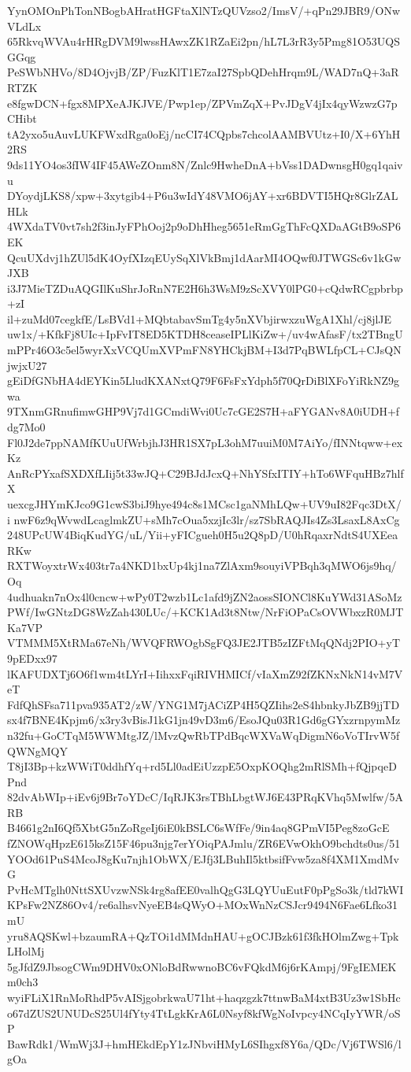 YynOMOnPhTonNBogbAHratHGFtaXlNTzQUVzso2/ImsV/+qPn29JBR9/ONwVLdLx
65RkvqWVAu4rHRgDVM9lwssHAwxZK1RZaEi2pn/hL7L3rR3y5Pmg81O53UQSGGqg
PeSWbNHVo/8D4OjvjB/ZP/FuzKlT1E7zaI27SpbQDehHrqm9L/WAD7nQ+3aRRTZK
e8fgwDCN+fgx8MPXeAJKJVE/Pwp1ep/ZPVmZqX+PvJDgV4jIx4qyWzwzG7pCHibt
tA2yxo5uAuvLUKFWxdRga0oEj/ncCI74CQpbs7chcolAAMBVUtz+I0/X+6YhH2RS
9ds11YO4os3fIW4IF45AWeZOnm8N/Znlc9HwheDnA+bVss1DADwnsgH0gq1qaivu
DYoydjLKS8/xpw+3xytgib4+P6u3wIdY48VMO6jAY+xr6BDVTI5HQr8GlrZALHLk
4WXdaTV0vt7sh2f3inJyFPhOoj2p9oDhHheg5651eRmGgThFcQXDaAGtB9oSP6EK
QcuUXdvj1hZUl5dK4OyfXIzqEUySqXlVkBmj1dAarMI4OQwf0JTWGSc6v1kGwJXB
i3J7MieTZDuAQGIlKuShrJoRnN7E2H6h3WsM9zScXVY0lPG0+cQdwRCgpbrbp+zI
il+zuMd07cegkfE/LsBVd1+MQbtabavSmTg4y5nXVbjirwxzuWgA1Xhl/cj8jlJE
uw1x/+KfkFj8UIc+IpFvIT8ED5KTDH8ceaseIPLlKiZw+/uv4wAfasF/tx2TBngU
mPPr46O3c5el5wyrXxVCQUmXVPmFN8YHCkjBM+I3d7PqBWLfpCL+CJsQNjwjxU27
gEiDfGNbHA4dEYKin5LludKXANxtQ79F6FsFxYdph5f70QrDiBlXFoYiRkNZ9gwa
9TXnmGRnufimwGHP9Vj7d1GCmdiWvi0Uc7cGE2S7H+aFYGANv8A0iUDH+fdg7Mo0
Fl0J2de7ppNAMfKUuUfWrbjhJ3HR1SX7pL3ohM7uuiM0M7AiYo/fINNtqww+exKz
AnRcPYxafSXDXfLIij5t33wJQ+C29BJdJcxQ+NhYSfxITIY+hTo6WFquHBz7hlfX
uexcgJHYmKJco9G1cwS3biJ9hye494c8s1MCsc1gaNMhLQw+UV9uI82Fqc3DtX/i
nwF6z9qWvwdLcaglmkZU+sMh7cOua5xzjIc3lr/sz7SbRAQJIs4Zs3LsaxL8AxCg
248UPcUW4BiqKudYG/uL/Yii+yFICgueh0H5u2Q8pD/U0hRqaxrNdtS4UXEeaRKw
RXTWoyxtrWx403tr7a4NKD1bxUp4kj1na7ZlAxm9souyiVPBqh3qMWO6js9hq/Oq
4udhuakn7nOx4l0cncw+wPy0T2wzb1Lc1afd9jZN2aossSIONCl8KuYWd31ASoMz
PWf/IwGNtzDG8WzZah430LUc/+KCK1Ad3t8Ntw/NrFiOPaCsOVWbxzR0MJTKa7VP
VTMMM5XtRMa67eNh/WVQFRWOgbSgFQ3JE2JTB5zIZFtMqQNdj2PIO+yT9pEDxx97
lKAFUDXTj6O6f1wm4tLYrI+IihxxFqiRIVHMICf/vIaXmZ92fZKNxNkN14vM7VeT
FdfQhSFsa711pva935AT2/zW/YNG1M7jACiZP4H5QZIihs2eS4hbnkyJbZB9jjTD
sx4f7BNE4Kpjm6/x3ry3vBisJ1kG1jn49vD3m6/EsoJQu03R1Gd6gGYxzrnpymMz
n32fu+GoCTqM5WWMtgJZ/lMvzQwRbTPdBqcWXVaWqDigmN6oVoTIrvW5fQWNgMQY
T8jI3Bp+kzWWiT0ddhfYq+rd5Ll0adEiUzzpE5OxpKOQhg2mRlSMh+fQjpqeDPnd
82dvAbWIp+iEv6j9Br7oYDcC/IqRJK3rsTBhLbgtWJ6E43PRqKVhq5Mwlfw/5ARB
B4661g2nI6Qf5XbtG5nZoRgeIj6iE0kBSLC6sWfFe/9in4aq8GPmVI5Peg8zoGcE
fZNOWqHpzE615ksZ15F46pu3njg7erYOiqPAJmlu/ZR6EVwOkhO9bchdts0us/51
YOOd61PuS4McoJ8gKu7njh1ObWX/EJfj3LBuhIl5ktbsifFvw5za8f4XM1XmdMvG
PvHcMTglh0NttSXUvzwNSk4rg8afEE0valhQgG3LQYUuEutF0pPgSo3k/tld7kWI
KPsFw2NZ86Ov4/re6alhsvNyeEB4sQWyO+MOxWnNzCSJcr9494N6Fae6Lfko31mU
yru8AQSKwl+bzaumRA+QzTOi1dMMdnHAU+gOCJBzk61f3fkHOlmZwg+TpkLHolMj
5gJfdZ9JbsogCWm9DHV0xONloBdRwwnoBC6vFQkdM6j6rKAmpj/9FgIEMEKm0ch3
wyiFLiX1RnMoRhdP5vAISjgobrkwaU71ht+haqzgzk7ttnwBaM4xtB3Uz3w1SbHc
o67dZUS2UNUDcS25Ul4fYty4TtLgkKrA6L0Nsyf8kfWgNoIvpcy4NCqIyYWR/oSP
BawRdk1/WmWj3J+hmHEkdEpY1zJNbviHMyL6SIhgxf8Y6a/QDc/Vj6TWSl6/lgOa
